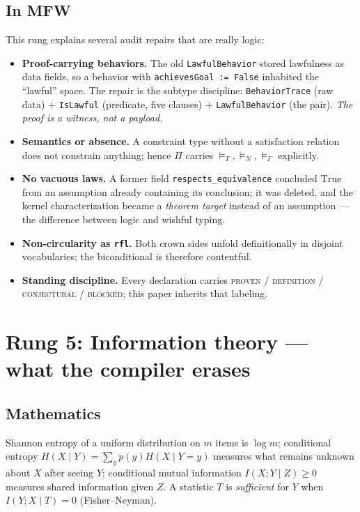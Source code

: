 \documentclass[11pt]{article}
\newcommand{\PT}{\Pi}
\theoremstyle{plain}
\theoremstyle{definition}
\theoremstyle{remark}
\begin{document}
\subsection{In MFW}
This rung explains several audit repairs that are really logic:
\begin{itemize}[nosep]
  \item \textbf{Proof-carrying behaviors.} The old
  \texttt{LawfulBehavior} stored lawfulness as data fields, so a behavior
  with \texttt{achievesGoal := False} inhabited the ``lawful'' space. The
  repair is the subtype discipline: \texttt{BehaviorTrace} (raw data)
  $+$ \texttt{IsLawful} (predicate, five clauses) $+$
  \texttt{LawfulBehavior} (the pair). \emph{The proof is a witness, not a
  payload.}
  \item \textbf{Semantics or absence.} A constraint type without a
  satisfaction relation does not constrain anything; hence $\PT$ carries
  $\models_T, \models_N, \models_\Gamma$ explicitly.
  \item \textbf{No vacuous laws.} A former field
  \texttt{respects\_equivalence} concluded $\mathrm{True}$ from an
  assumption already containing its conclusion; it was deleted, and the
  kernel characterization became a \emph{theorem target} instead of an
  assumption --- the difference between logic and wishful typing.
  \item \textbf{Non-circularity as \texttt{rfl}.} Both crown sides unfold
  definitionally in disjoint vocabularies; the biconditional is therefore
  contentful.
  \item \textbf{Standing discipline.} Every declaration carries
  \textsc{proven} / \textsc{definition} / \textsc{conjectural} /
  \textsc{blocked}; this paper inherits that labeling.
\end{itemize}

\section{Rung 5: Information theory --- what the compiler erases}
\label{sec:rung5}

\subsection{Mathematics}
Shannon entropy of a uniform distribution on $m$ items is $\log m$;
conditional entropy $H(X \mid Y) = \sum_y p(y) H(X \mid Y = y)$ measures
what remains unknown about $X$ after seeing $Y$; conditional mutual
information $I(X; Y \mid Z) \ge 0$ measures shared information given $Z$.
A statistic $T$ is \emph{sufficient} for $Y$ when $I(Y; X \mid T) = 0$
(Fisher--Neyman).
\end{document}
